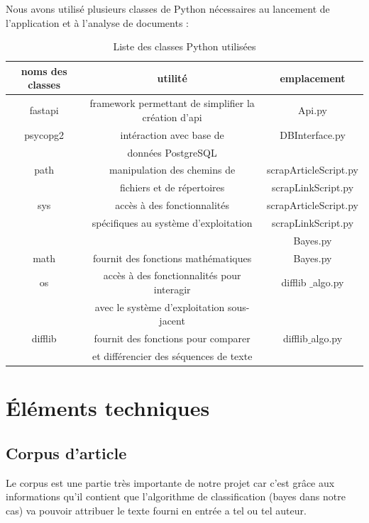 \documentclass[french,12pt]{article}
\begin{document}
Nous avons utilisé plusieurs classes de Python nécessaires au lancement de l'application et à l'analyse de documents :

\begin{table}[h]
   \begin{tabular}{| c | c | c |}
      \hline
      \textbf{noms des classes} & \textbf{utilité} & \textbf{emplacement} \\
      \hline
      fastapi & framework permettant de simplifier la création d'api & Api.py\\
      \hline
      psycopg2 & intéraction avec base de & DBInterface.py \\
      & données PostgreSQL & \\
      \hline
      path & manipulation des chemins de  & scrapArticleScript.py \\
      & fichiers et de répertoires & scrapLinkScript.py \\
      \hline
      sys & accès à des fonctionnalités & scrapArticleScript.py \\
      & spécifiques au système d'exploitation & scrapLinkScript.py \\
      & & Bayes.py \\
      \hline
      math & fournit des fonctions mathématiques & Bayes.py \\
      \hline
      os & accès à des fonctionnalités pour interagir & difflib $\_$algo.py \\
      & avec le système d'exploitation sous-jacent & \\
      \hline
      difflib & fournit des fonctions pour comparer  & difflib$\_$algo.py
      \\ & et différencier des séquences de texte & \\
      \hline
   \end{tabular}
   \caption{Liste des classes Python utilisées}
\end{table}

\section{Éléments techniques} \label{elemTech}

\subsection{Corpus d'article}

Le corpus est une partie très importante de notre projet car c'est grâce aux informations qu'il contient que l'algorithme de classification (bayes dans notre cas) va pouvoir attribuer le texte fourni en entrée a tel ou tel auteur.\\
\end{document}
